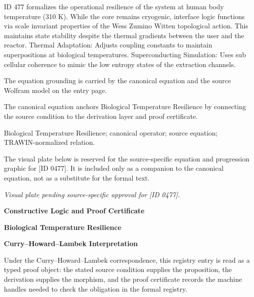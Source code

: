 ID 477 formalizes the operational resilience of the system at human body temperature (310 K). While the core remains cryogenic, interface logic functions via scale invariant properties of the Wess Zumino Witten topological action. This maintains state stability despite the thermal gradients between the user and the reactor. Thermal Adaptation: Adjusts coupling constants to maintain superpositions at biological temperatures. Superconducting Simulation: Uses sub cellular coherence to mimic the low entropy states of the extraction channels.

The equation grounding is carried by the canonical equation and the source Wolfram model on the entry page.

The canonical equation anchors Biological Temperature Resilience by connecting the source condition to the derivation layer and proof certificate.

Biological Temperature Resilience; canonical operator; source equation; TRAWIN-normalized relation.
\endgroup

\begingroup\footnotesize\sloppy
The visual plate below is reserved for the source-specific equation and progression graphic for [ID 0477]. It is included only as a companion to the canonical equation, not as a substitute for the formal text.
\par\endgroup
\begingroup\footnotesize\itshape
Visual plate pending source-specific approval for [ID 0477].
\par\endgroup

\clearpage
\begingroup\tzpsupportsetup
\noindent\textbf{\fontsize{10.8pt}{12.8pt}\selectfont [ID 0477] Constructive Logic and Proof Certificate}\par
\noindent\textbf{\fontsize{10pt}{12pt}\selectfont Biological Temperature Resilience}\par
\vspace{0.45em}
\begingroup
\footnotesize
\setlength{\parskip}{0.22em}
\setlength{\parindent}{0pt}
\noindent\textbf{Curry--Howard--Lambek Interpretation}\par
Under the Curry--Howard--Lambek correspondence, this registry entry is read as a typed proof
object: the stated source condition supplies the proposition, the derivation supplies the
morphism, and the proof certificate records the machine handles needed to check the obligation
in the formal registry.

